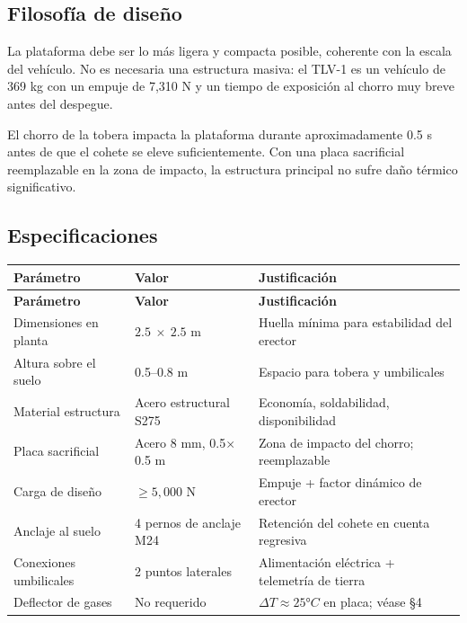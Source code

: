 \documentclass[11pt, a4paper]{article}
\begin{document}
\subsection{Filosofía de dise\~{n}o}

La plataforma debe ser lo m\'{a}s ligera y compacta posible, coherente con la escala del veh\'{i}culo. No es necesaria una estructura masiva: el TLV-1 es un veh\'{i}culo de 369 kg con un empuje de 7{,}310 N y un tiempo de exposici\'{o}n al chorro muy breve antes del despegue.

El chorro de la tobera impacta la plataforma durante aproximadamente 0.5 s antes de que el cohete se eleve suficientemente. Con una placa sacrificial reemplazable en la zona de impacto, la estructura principal no sufre da\~{n}o t\'{e}rmico significativo.

\subsection{Especificaciones}

\begin{longtable}{L{5cm} C{3.5cm} L{5cm}}
  \color{white}\textbf{Par\'{a}metro} &
  \color{white}\textbf{Valor} &
  \color{white}\textbf{Justificaci\'{o}n} \\
  \endfirsthead
  \color{white}\textbf{Par\'{a}metro} &
  \color{white}\textbf{Valor} &
  \color{white}\textbf{Justificaci\'{o}n} \\
  \endhead
  Dimensiones en planta      & $2.5\ \times\ 2.5$ m   & Huella m\'{i}nima para estabilidad del erector \\
  Altura sobre el suelo      & 0.5--0.8 m             & Espacio para tobera y umbilicales \\
  Material estructura        & Acero estructural S275  & Econom\'{i}a, soldabilidad, disponibilidad \\
  Placa sacrificial          & Acero 8 mm, 0.5$\times$0.5 m & Zona de impacto del chorro; reemplazable \\
  Carga de dise\~{n}o        & $\geq 5{,}000$ N        & Empuje + factor din\'{a}mico de erector \\
  Anclaje al suelo           & 4 pernos de anclaje M24 & Retenci\'{o}n del cohete en cuenta regresiva \\
  Conexiones umbilicales     & 2 puntos laterales      & Alimentaci\'{o}n el\'{e}ctrica + telemetr\'{i}a de tierra \\
  Deflector de gases         & No requerido            & $\Delta T \approx 25°C$ en placa; v\'{e}ase \S4 \\
\end{longtable}
\end{document}
